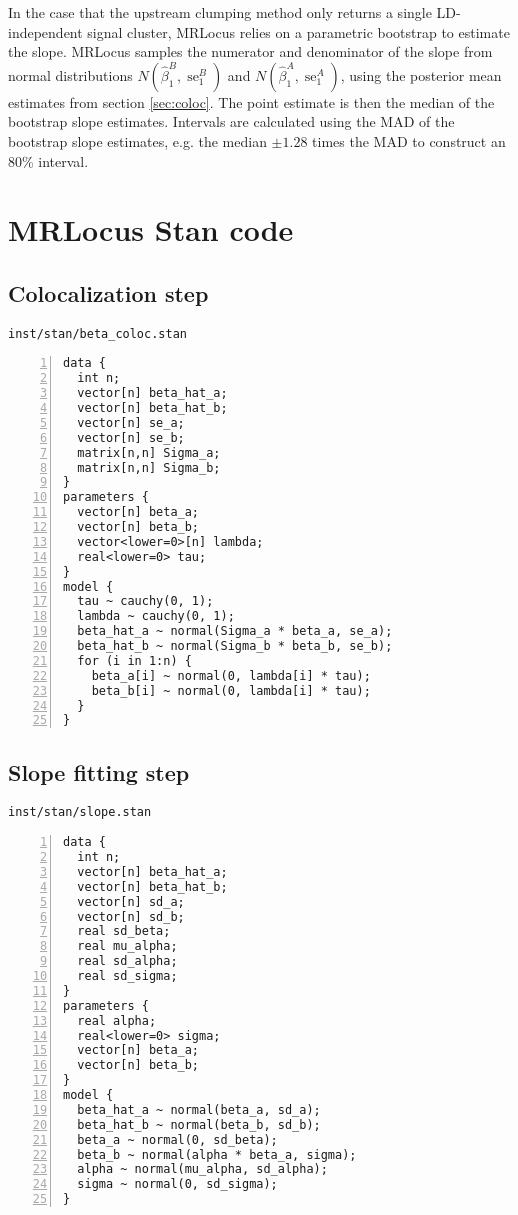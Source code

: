 \documentclass[11pt]{article}
\DeclareMathOperator{\se}{\textrm{se}}
\begin{document}
In the case that the upstream clumping method only returns a single
LD-independent signal cluster, MRLocus relies on a parametric
bootstrap to estimate the slope. MRLocus samples the numerator and
denominator of the slope from normal distributions 
$N(\widehat{\beta}_1^B,\se_1^B)$ and $N(\widehat{\beta}_1^A, \se_1^A)$,
using the posterior mean estimates from section \ref{sec:coloc}.
The point estimate is then the median of the bootstrap slope
estimates. Intervals are calculated using the MAD of the bootstrap
slope estimates, e.g. the median $\pm 1.28$ times the MAD to construct
an 80\% interval.

\newpage

\section{MRLocus Stan code}

\subsection{Colocalization step}

\texttt{inst/stan/beta\_coloc.stan}

\begin{Verbatim}[frame=single,numbers=left]
data {
  int n;
  vector[n] beta_hat_a;
  vector[n] beta_hat_b;
  vector[n] se_a;
  vector[n] se_b;
  matrix[n,n] Sigma_a;
  matrix[n,n] Sigma_b;
}
parameters {
  vector[n] beta_a;
  vector[n] beta_b;
  vector<lower=0>[n] lambda;
  real<lower=0> tau;
}
model {
  tau ~ cauchy(0, 1);
  lambda ~ cauchy(0, 1);
  beta_hat_a ~ normal(Sigma_a * beta_a, se_a);
  beta_hat_b ~ normal(Sigma_b * beta_b, se_b);
  for (i in 1:n) {
    beta_a[i] ~ normal(0, lambda[i] * tau);
    beta_b[i] ~ normal(0, lambda[i] * tau);
  }
}
\end{Verbatim}

\newpage

\subsection{Slope fitting step}

\texttt{inst/stan/slope.stan}

\begin{Verbatim}[frame=single,numbers=left]
data {
  int n; 
  vector[n] beta_hat_a;
  vector[n] beta_hat_b;
  vector[n] sd_a;
  vector[n] sd_b;
  real sd_beta;
  real mu_alpha;
  real sd_alpha;
  real sd_sigma;
}
parameters {
  real alpha;
  real<lower=0> sigma;
  vector[n] beta_a;
  vector[n] beta_b;
}
model {
  beta_hat_a ~ normal(beta_a, sd_a);
  beta_hat_b ~ normal(beta_b, sd_b);
  beta_a ~ normal(0, sd_beta);
  beta_b ~ normal(alpha * beta_a, sigma);
  alpha ~ normal(mu_alpha, sd_alpha);
  sigma ~ normal(0, sd_sigma);
}
\end{Verbatim}

\newpage


\end{document}
